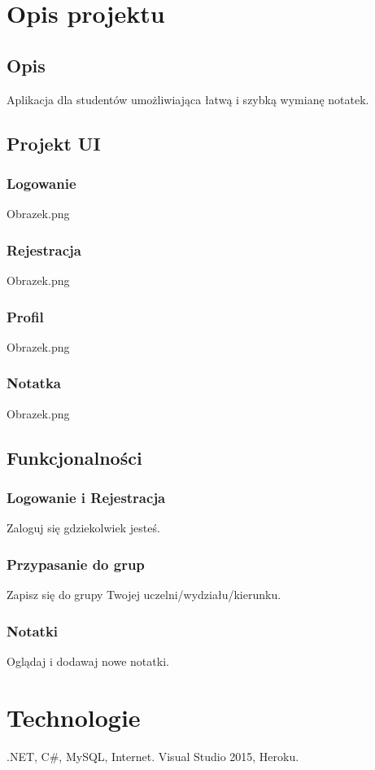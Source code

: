 \documentclass[12pt,a4paper]{article}
\begin{document}
	\section{Opis projektu}
		\subsection{Opis}
			Aplikacja dla studentów umożliwiająca łatwą i szybką wymianę notatek.
		\subsection{Projekt UI}
			\subsubsection{Logowanie}
				Obrazek.png
			\subsubsection{Rejestracja}
				Obrazek.png
			\subsubsection{Profil}
				Obrazek.png
			\subsubsection{Notatka}
				Obrazek.png
		\subsection{Funkcjonalności}
			\subsubsection{Logowanie i Rejestracja}
				Zaloguj się gdziekolwiek jesteś.
			\subsubsection{Przypasanie do grup}
				Zapisz się do grupy Twojej uczelni/wydziału/kierunku.
			\subsubsection{Notatki}
				Oglądaj i dodawaj nowe notatki.
	\section{Technologie}
			.NET, C\#, MySQL, Internet.
			Visual Studio 2015, Heroku.
	
\end{document}
